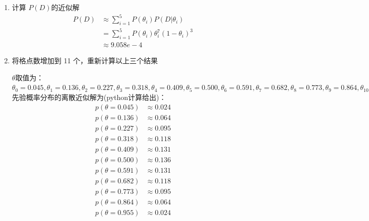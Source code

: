 \documentclass[stu,12pt,floatsintext]{apa7} %
\begin{document}
\begin{enumerate}[itemsep=2pt,topsep=0pt,parsep=0pt,label=(\alph*)]
    \item 计算 \(P(D)\)的近似解
    \begin{align*}
        P(D) & \approx \sum_{i=1}^{5}P(\theta_i)P(D|\theta_i)\\
        & = \sum_{i=1}^{5}P(\theta_i)\theta_i^7 (1-\theta_i)^3\\
        & \approx 9.058e-4
    \end{align*}


    \item 将格点数增加到 11 个，重新计算以上三个结果
    
    \(\theta\)取值为：\(\theta_0 = 0.045, \theta_1 = 0.136, \theta_2 = 0.227, \theta_3 = 0.318, \theta_4 = 0.409, \theta_5 = 0.500, \theta_6 = 0.591, \theta_7 = 0.682, \theta_8 = 0.773, \theta_9 = 0.864, \theta_{10} = 0.955\)\\
    
    先验概率分布的离散近似解为(python计算给出)：
    \begin{align*}
        p(\theta = 0.045) & \approx 0.024\\
        p(\theta = 0.136) & \approx 0.064\\
        p(\theta = 0.227) & \approx 0.095\\
        p(\theta = 0.318) & \approx 0.118\\
        p(\theta = 0.409) & \approx 0.131\\
        p(\theta = 0.500) & \approx 0.136\\
        p(\theta = 0.591) & \approx 0.131\\
        p(\theta = 0.682) & \approx 0.118\\
        p(\theta = 0.773) & \approx 0.095\\
        p(\theta = 0.864) & \approx 0.064\\
        p(\theta = 0.955) & \approx 0.024
    \end{align*}\\


\end{enumerate}
\end{document}
